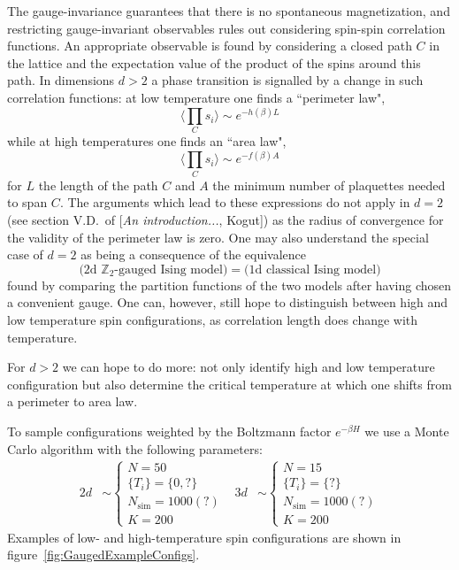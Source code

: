 \documentclass[11pt]{article}
\begin{document}
The gauge-invariance guarantees that there is no spontaneous magnetization, and restricting gauge-invariant observables rules out considering spin-spin correlation functions. An appropriate observable is found by considering a closed path $C$ in the lattice and the expectation value of the product of the spins around this path. In dimensions $d>2$ a phase transition is signalled by a change in such correlation functions: at low temperature one finds a ``perimeter law",
\begin{equation}
    \Big\langle\prod_C s_i\Big\rangle \sim e^{-h(\beta)L}
\end{equation}
while at high temperatures one finds an ``area law",
\begin{equation}
    \Big\langle\prod_C s_i\Big\rangle \sim e^{-f(\beta)A}
\end{equation}
for $L$ the length of the path $C$ and $A$ the minimum number of plaquettes needed to span $C$. The arguments which lead to these expressions do not apply in $d=2$ (see section V.D.~of [\textit{An introduction...}, Kogut]) as the radius of convergence for the validity of the perimeter law is zero. One may also understand the special case of $d=2$ as being a consequence of the equivalence
\begin{equation}
    \big(\text{2d }\mathbb{Z}_2\text{-gauged Ising model}\big) = \big( \text{1d classical Ising model} \big)
\end{equation}
found by comparing the partition functions of the two models after having chosen a convenient gauge. One can, however, still hope to distinguish between high and low temperature spin configurations, as correlation length does change with temperature.

For $d>2$ we can hope to do more: not only identify high and low temperature configuration but also determine the critical temperature at which one shifts from a perimeter to area law.

To sample configurations weighted by the Boltzmann factor $e^{-\beta H}$ we use a Monte Carlo algorithm with the following parameters:
\begin{align}
    2d&\sim\left\{\begin{array}{l}
        N = 50\\
        \{T_i\} = \{0,?\}\\
        N_\text{sim} = 1000(?)\\
        K = 200
    \end{array}\right. & 3d&\sim\left\{\begin{array}{l}
        N = 15\\
        \{T_i\} = \{?\}\\
        N_\text{sim} = 1000(?)\\
        K = 200
    \end{array}\right.
\end{align}
Examples of low- and high-temperature spin configurations are shown in figure~\ref{fig:GaugedExampleConfigs}.
\end{document}
